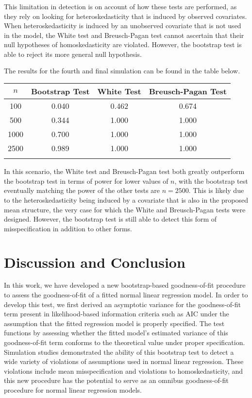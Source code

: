 \documentclass[12pt]{article} %
\theoremstyle{definition}
\begin{document}
This limitation in detection is on account of how these tests are performed, as they rely on looking for heteroskedasticity that is induced by observed covariates.
When heteroskedasticity is induced by an unobserved covariate that is not used in the model, the White test and Breusch-Pagan test cannot ascertain that their
null hypotheses of homoskedasticity are violated. However, the bootstrap test is able to reject its more general null hypothesis.

The results for the fourth and final simulation can be found in the table below.

\begin{table}[H]
	\centering
	\small\addtolength{\tabcolsep}{-3pt}
	\setlength\extrarowheight{-3pt}
	{
	\begin{tabular}{ c|c|c|c}
	$n$ & Bootstrap Test & White Test & Breusch-Pagan Test \\
	 \hline
	 100 & 0.040 & 0.462 & 0.674 \\
	 500 & 0.344 & 1.000 & 1.000 \\
	 1000 & 0.700 & 1.000 & 1.000 \\
	 2500 & 0.989 & 1.000 & 1.000 \\
	 \Xhline{3\arrayrulewidth}
	\end{tabular}
	}
\end{table}

In this scenario, the White test and Breusch-Pagan test both greatly outperform the bootstrap test in terms of power for lower values of $n$, with the bootstrap test
eventually matching the power of the other tests are $n = 2500$. This is likely due to the heteroskedasticity being induced by a covariate that is also in the 
proposed mean structure, the very case for which the White and Breusch-Pagan tests were designed. However, the bootstrap test is still able to detect this form of
misspecification in addition to other forms.


\section{Discussion and Conclusion}

In this work, we have developed a new bootstrap-based goodness-of-fit procedure to assess the goodness-of-fit of a fitted normal linear regression model. In order
to develop this test, we first derived an asymptotic variance for the goodness-of-fit term present in likelihood-based information criteria such as AIC under the assumption
that the fitted regression model is properly specified. The test functions by assessing whether the fitted model's estimated variance of this goodness-of-fit term conforms to the
theoretical value under proper specification. Simulation studies demonstrated the ability of this bootstrap test to detect a wide variety of violations of assumptions used in
normal linear regression. These violations include mean misspecification and violations to homoskedasticity, and this new procedure has the potential to serve as an omnibus
goodness-of-fit procedure for normal linear regression models.
\end{document}
